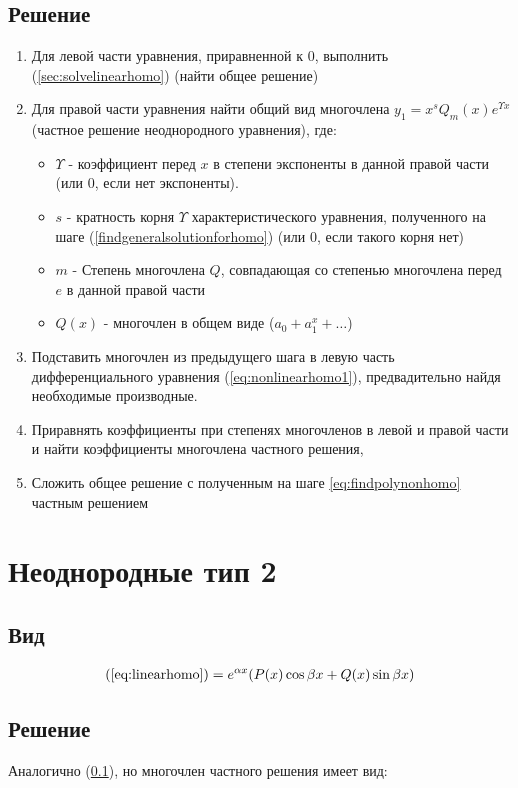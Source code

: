 \documentclass[fontsize=10pt,a4paper,fleqn]{scrreprt} %
\numberwithin{equation}{section}
\begin{document}
\subsection{Решение}
\label{sec:solvenonhomotype1}

\begin{enumerate}
\item Для левой части уравнения, приравненной к 0, выполнить (\ref{sec:solvelinearhomo}) (найти общее решение) \label{findgeneralsolutionforhomo}
\item Для правой части уравнения найти общий  вид многочлена $y_1 = x^sQ_m(x)e^{\Upsilon x}$ (частное решение неоднородного уравнения), где:
  \begin{itemize}
  \item $\Upsilon$ - коэффициент перед $x$ в степени экспоненты в данной правой части (или $0$, если нет экспоненты).
  \item $s$ - кратность корня $\Upsilon$ характеристического уравнения, полученного на шаге (\ref{findgeneralsolutionforhomo}) (или $0$, если такого корня нет)
  \item $m$ - Степень многочлена $Q$, совпадающая со степенью многочлена перед $e$ в данной правой части
  \item $Q(x)$ - многочлен в общем виде ($a_0 + a_1^x + \ldots$)
  \end{itemize} \label{eq:findpolynonhomo}
\item Подставить многочлен из предыдущего шага в левую часть дифференциального уравнения (\ref{eq:nonlinearhomo1}), предвадительно найдя необходимые производные.
\item Приравнять коэффициенты при степенях многочленов в левой и правой части и найти коэффициенты многочлена частного решения,
\item Сложить общее решение с полученным на шаге \ref{eq:findpolynonhomo} частным решением
\end{enumerate}

\section{Неоднородные тип 2}

\subsection{Вид}
\begin{align}
  (\ref{eq:linearhomo}) = e^{\alpha x}(P(x)\cos \beta x + Q(x)\sin\beta x)
\end{align}

\subsection{Решение}
Аналогично (\ref{sec:solvenonhomotype1}), но многочлен частного решения имеет вид:
\end{document}
